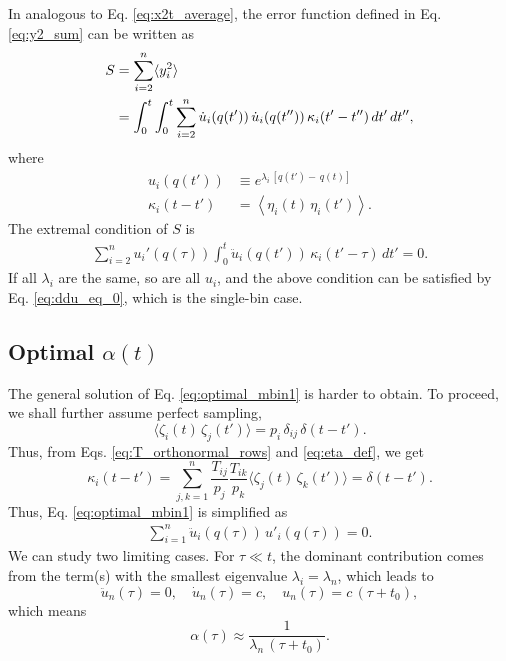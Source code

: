 \documentclass[reprint]{revtex4-1}
\begin{document}
In analogous to Eq. \eqref{eq:x2t_average},
the error function defined in Eq. \eqref{eq:y2_sum}
can be written as
%
\begin{align}
  S
  &= \sum_{i = 2}^n \langle y_i^2 \rangle
  \notag
  \\
  &=
  \int_0^t \int_0^t
  \sum_{i = 2}^n
  \dot u_i(q(t')) \,
  \dot u_i(q(t'')) \,
  \kappa_i(t' - t'') \, dt' \, dt'',
  \label{eq:y2_int}
\end{align}
%
where
\begin{align}
  u_i(q(t'))
  &\equiv
  e^{\lambda_i \, [q(t') - \, q(t)]}
  \\
  \kappa_i(t - t')
  &=
  \left\langle \eta_i(t) \, \eta_i(t') \right\rangle.
\end{align}
%
The extremal condition of $S$ is
%
\begin{align}
\sum_{i=2}^n
u_i'(q(\tau))
\int_0^t
\ddot u_i(q(t')) \, \kappa_i(t' - \tau) \, dt' = 0.
\label{eq:optimal_mbin1}
\end{align}
%
If all $\lambda_i$ are the same,
so are all $u_i$,
and the above condition can be satisfied
by Eq. \eqref{eq:ddu_eq_0},
which is the single-bin case.



\subsection{Optimal $\alpha(t)$}


The general solution of Eq. \eqref{eq:optimal_mbin1}
is harder to obtain.
%
To proceed, we shall further assume perfect sampling,
%
\begin{equation}
  \langle \zeta_i(t) \, \zeta_j(t') \rangle
  =
  p_i \, \delta_{ij} \, \delta(t - t').
  \label{eq:zz_perfect}
\end{equation}
%
Thus, from Eqs. \eqref{eq:T_orthonormal_rows} and \eqref{eq:eta_def},
we get
%
\begin{equation}
  \kappa_i(t - t')
  =
  \sum_{j,k = 1}^n
  \frac{ T_{ij} } { p_j }
  \frac{ T_{ik} } { p_k }
  \langle \zeta_j(t) \, \zeta_k(t') \rangle
  =
  \delta(t - t').
  \label{eq:kappa_perfect}
\end{equation}
%
Thus, Eq. \eqref{eq:optimal_mbin1}
is simplified as
%
\begin{align}
  \sum_{i=1}^n
  \ddot u_i(q(\tau)) \, u'_i(q(\tau)) = 0.
  \label{eq:optimal_mbin2}
\end{align}
%
We can study two limiting cases.
%
For $\tau \ll t$,
the dominant contribution comes from
the term(s) with the smallest eigenvalue $\lambda_i = \lambda_n$,
which leads to
$$
\ddot u_n(\tau) = 0,
\quad
\dot u_n(\tau) = c,
\quad
u_n(\tau) = c \, (\tau + t_0),
$$
which means
$$
\alpha(\tau) \approx \frac{1}{\lambda_n \, (\tau + t_0)}.
$$
\end{document}
